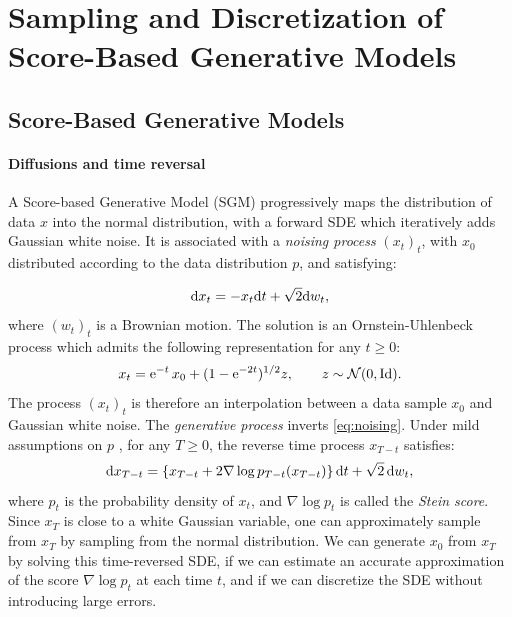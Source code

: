 \documentclass{article}
\begin{document}
\section{Sampling and Discretization of Score-Based Generative Models}
\label{sec:time-sampling-score}
\subsection{Score-Based Generative Models}

\paragraph{Diffusions and time reversal} 
A Score-based Generative Model (SGM)
\citep{song2019generative,song2020score,ho2020denoising} progressively maps the
distribution of data $x$ into the normal distribution, with a forward SDE which
iteratively adds Gaussian white noise.
It is associated with a {\it noising
process} $(x_t)_t$, with $x_0$ distributed according to the data
distribution $p$, and satisfying:

\begin{equation}
  \mathrm{d} x_t = -x_t \mathrm{d} t + \sqrt{2} \mathrm{d} w_t, \label{eq:noising}
\end{equation}
where $(w_t)_t$ is a Brownian motion.
The solution is an Ornstein-Uhlenbeck
process which admits the following representation for any $t \geq 0$:
\begin{equation}
  \label{eq:OU_sol}
  x_t = \mathrm{e}^{-t}\, x_0 + (1- \mathrm{e}^{-2t})^{1/2} z , \qquad z \sim {\cal N}(0,\operatorname{Id}) . 
\end{equation}
The process $(x_t)_t$ is therefore an interpolation between a data sample $x_0$ and
Gaussian white noise. The \emph{generative process} inverts
\eqref{eq:noising}. Under mild assumptions on $p$
\citep{cattiaux2021time,haussmann1986time}, for any $T \geq 0$, the reverse time
process $x_{T-t}$ satisfies:
\begin{equation} \label{eq:generative_modeling} 
\mathrm{d} x_{T-t} = \{ x_{T-t} + 2
  \nabla \log p_{T-t}(x_{T-t})\}\, \mathrm{d} t + \sqrt{2} \,\mathrm{d} w_t,
\end{equation}
where $p_t$ is the probability density of $x_t$, and $\nabla \log p_t$ is called
the {\it Stein score}.  Since $x_T$ is close to a white Gaussian
variable, one can approximately sample from $x_T$ by sampling from the normal distribution.
We can generate $x_0$ from $x_T$ by solving this
time-reversed SDE, if we can estimate an accurate approximation of the score
$\nabla \log p_t$ at each time $t$, and if we can discretize the SDE without
introducing large errors.
\end{document}
